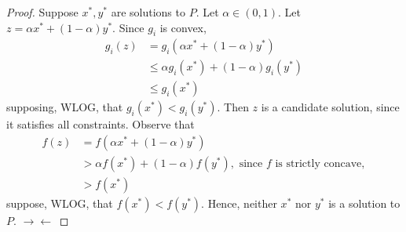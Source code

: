 \documentclass[12pt]{article}
\theoremstyle{definition}
\theoremstyle{remark}
\def\contra{\rightarrow \leftarrow}
\begin{document}
\begin{proof}
Suppose $x^*, y^*$ are solutions to $P$. Let $\alpha \in (0,1)$. Let $z = \alpha x^* + (1-\alpha)y^*$. Since $g_i$ is convex,
\begin{align*}
  g_i(z) &= g_i(\alpha x^* + (1-\alpha)y^*) \\
  &\leq \alpha g_i(x^*) + (1-\alpha)g_i(y^*) \\
  &\leq g_i(x^*)
\end{align*}
supposing, WLOG, that $g_i(x^*) < g_i(y^*)$. Then $z$ is a candidate solution, since it satisfies all constraints. Observe that
\begin{align*}
  f(z) &= f(\alpha x^* + (1-\alpha)y^*) \\
  &> \alpha f(x^*) + (1-\alpha)f(y^*), \text{ since $f$ is strictly concave}, \\
  &> f(x^*)
\end{align*}
suppose, WLOG, that $f(x^*) < f(y^*)$. Hence, neither $x^*$ nor $y^*$ is a solution to $P$. $\contra$
\end{proof}
\end{document}
